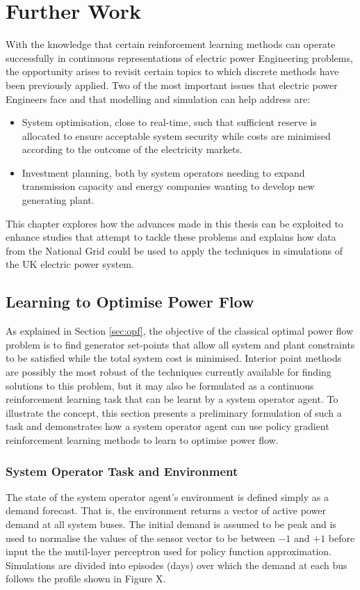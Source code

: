 \chapter{Further Work}
\label{sec:furtherwork}
With the knowledge that certain reinforcement learning methods can operate
successfully in continuous representations of electric power Engineering
problems, the opportunity arises to revisit certain topics to which discrete
methods have been previously applied.  Two of the most important issues that
electric power Engineers face and that modelling and simulation can help
address are:
\begin{itemize}
  \item System optimisation, close to real-time, such that sufficient reserve
  is allocated to ensure acceptable system security while costs are minimised
  according to the outcome of the electricity markets.
  \item Investment planning, both by system operators needing to expand
  transmission capacity and energy companies wanting to develop new generating
  plant.
\end{itemize}
This chapter explores how the advances made in this thesis can be exploited to
enhance studies that attempt to tackle these problems and explains how data
from the National Grid could be used to apply the techniques in simulations of
the UK electric power system.

\section{Learning to Optimise Power Flow}
As explained in Section \ref{sec:opf}, the objective of the classical optimal
power flow problem is to find generator set-points that allow all system and
plant constraints to be satisfied while the total system cost is minimised.
Interior point methods are possibly the most robust of the techniques currently
available for finding solutions to this problem, but it may also be
formulated as a continuous reinforcement learning task that can be learnt by a
system operator agent.  To illustrate the concept, this section presents a
preliminary formulation of such a task and demonstrates how a system operator
agent can use policy gradient reinforcement learning methods to learn to
optimise power flow.

\subsection{System Operator Task and Environment}
The state of the system operator agent's environment is defined simply as a
demand forecast.  That is, the environment returns a vector of active power
demand at all system buses.  The initial demand is assumed to be peak and is
used to normalise the values of the sensor vector to be between $-1$ and $+1$
before input the the mutil-layer perceptron used for policy function
approximation.  Simulations are divided into episodes (days) over which the
demand at each bus follows the profile shown in Figure X.

